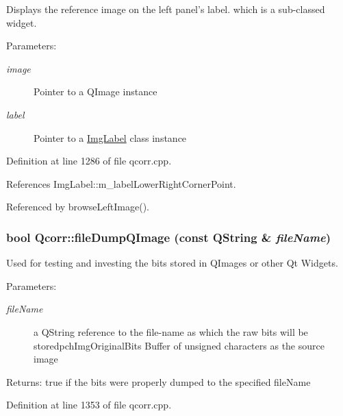 Displays the reference image on the left panel's label. which is a sub-classed widget. 

\begin{Desc}
\item[Parameters:]
\begin{description}
\item[{\em image}]Pointer to a QImage instance \item[{\em label}]Pointer to a \hyperlink{classImgLabel}{ImgLabel} class instance \end{description}
\end{Desc}


Definition at line 1286 of file qcorr.cpp.

References ImgLabel::m\_\-labelLowerRightCornerPoint.

Referenced by browseLeftImage().\hypertarget{classQcorr_87229fc918fa4011e96fbadb325fd52e}{
\subsubsection[{fileDumpQImage}]{\setlength{\rightskip}{0pt plus 5cm}bool Qcorr::fileDumpQImage (const QString \& {\em fileName})}}
\label{classQcorr_87229fc918fa4011e96fbadb325fd52e}


Used for testing and investing the bits stored in QImages or other Qt Widgets. 

\begin{Desc}
\item[Parameters:]
\begin{description}
\item[{\em fileName}]a QString reference to the file-name as which the raw bits will be storedpchImgOriginalBits Buffer of unsigned characters as the source image \end{description}
\end{Desc}
\begin{Desc}
\item[Returns:]true if the bits were properly dumped to the specified fileName \end{Desc}


Definition at line 1353 of file qcorr.cpp.

